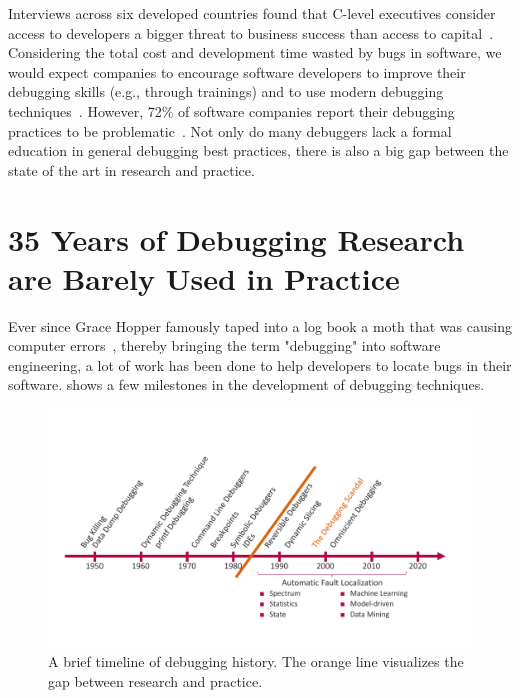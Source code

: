 \bigskip\noindent

Interviews across six developed countries found that C-level executives consider access to developers a bigger threat to business success than access to capital~\cite{stripe18:the_developer_coefficient}.
Considering the total cost and development time wasted by bugs in software, we would expect companies to encourage software developers to improve their debugging skills (e.g., through trainings) and to use modern debugging techniques~\cite{zhivich09:the_real_cost}.
However, 72\% of software companies report their debugging practices to be problematic~\cite{ballou08:improving_software_quality}.
Not only do many debuggers lack a formal education in general debugging best practices, there is also a big gap between the state of the art in research and practice.



\section{35 Years of Debugging Research are Barely Used in Practice}

Ever since Grace Hopper famously taped into a log book a moth that was causing computer errors~\cite{hopper47:log_book_with_computer}, thereby bringing the term "debugging" into software engineering, a lot of work has been done to help developers to locate bugs in their software.
 shows a few milestones in the development of debugging techniques.


\begin{figure}[t]
\centering
\includegraphics[width=\linewidth]{img/debugging-timeline}
\caption[A brief timeline of debugging history]{A brief timeline of debugging history. The orange line visualizes the gap between research and practice.}
\label{fig:debugging-timeline}
\end{figure}

